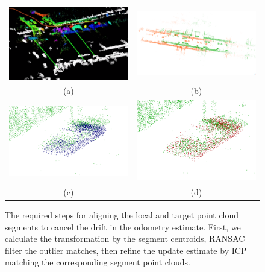 \documentclass[letterpaper, 10 pt, conference]{ieeeconf}  %
\begin{document}
\begin{figure}[ht!]
    \begin{center} \begin{tabular}{c@{\hspace{1mm}}c@{\hspace{1mm}}}
        \includegraphics*[width=0.44\linewidth]{figures/match_recognition.png} &
        \includegraphics*[width=0.44\linewidth]{figures/prior_transform.png} \\
        (a) & (b) \\
        \includegraphics*[width=0.44\linewidth]{figures/after_align.png} &
        \includegraphics*[width=0.44\linewidth]{figures/icp_refine.png} \\
         (c) & (d)\\
    \end{tabular}
        \caption{The required steps for aligning the local and target point cloud segments to cancel the drift in the odometry estimate. First, we calculate the transformation by the segment centroids, RANSAC filter the outlier matches, then refine the update estimate by ICP matching the corresponding segment point clouds.}
    \label{fig:pose_refine}
    \end{center}
\end{figure}
\end{document}
